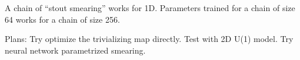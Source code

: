 A chain of ``stout smearing'' works for 1D.
Parameters trained for a chain of size 64 works for a chain of size 256.

Plans: Try optimize the trivializing map directly.
Test with 2D U(1) model.
Try neural network parametrized smearing.
